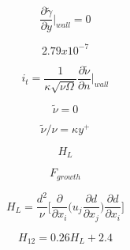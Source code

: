 {\newpage\clearpage
{}%
\begin{displaymath}
\frac{\partial \tilde{\gamma}}{\partial y} \bigg|  _{wall} = 0
\end{displaymath}%
\lthtmldisplayZ
\lthtmlcheckvsize\clearpage}

{\newpage\clearpage
{}%
\begin{displaymath}
2.79 {x} 10^{-7}
\end{displaymath}%
\lthtmldisplayZ
\lthtmlcheckvsize\clearpage}

{\newpage\clearpage
{}%
\begin{displaymath}
i_t = \frac{1}{\kappa \sqrt{\nu \Omega}} \frac{\partial \tilde{\nu}}{\partial n} \bigg | _{wall}
\end{displaymath}%
\lthtmldisplayZ
\lthtmlcheckvsize\clearpage}

{\newpage\clearpage
{}%
\begin{displaymath}
\tilde{\nu} = 0
\end{displaymath}%
\lthtmldisplayZ
\lthtmlcheckvsize\clearpage}

{\newpage\clearpage
{}%
\begin{displaymath}
\tilde{\nu}/\nu = \kappa y^+
\end{displaymath}%
\lthtmldisplayZ
\lthtmlcheckvsize\clearpage}

{\newpage\clearpage
{}%
\begin{displaymath}
H_L
\end{displaymath}%
\lthtmldisplayZ
\lthtmlcheckvsize\clearpage}

{\newpage\clearpage
{}%
\begin{displaymath}
F_{growth}
\end{displaymath}%
\lthtmldisplayZ
\lthtmlcheckvsize\clearpage}

{\newpage\clearpage
{}%
\begin{displaymath}
H_L = \frac{d^2}{\nu} \bigg[ \frac{\partial}{\partial x_i} \Big(u_j \frac{\partial d}{\partial x_j} \Big) \frac{\partial d}{\partial x_i} \bigg]
\end{displaymath}%
\lthtmldisplayZ
\lthtmlcheckvsize\clearpage}

{\newpage\clearpage
{}%
\begin{displaymath}
H_{12} = 0.26 H_L + 2.4
\end{displaymath}%
\lthtmldisplayZ
\lthtmlcheckvsize\clearpage}

